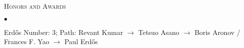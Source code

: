 \documentclass[10pt]{article}
\newcommand{\lineunder}{\\\vspace{-9pt}\hrulefill}
\newcommand{\header}[1]{{\normalsize\scshape{#1}} \lineunder}
\newenvironment{achievements}{\begin{list}{$\bullet$}{\topsep 0pt \itemsep 0pt}}{\end{list}}
\begin{document}
\vspace{3pt}

\header{Honors and Awards}
\begin{achievements}
\item Erd\H{o}s Number: 3; Path: Revant Kumar $\rightarrow$ Tetsuo Asano $\rightarrow$ Boris Aronov / Frances F. Yao $\rightarrow$ Paul Erd\H{o}s
\end{achievements}


\end{document}
